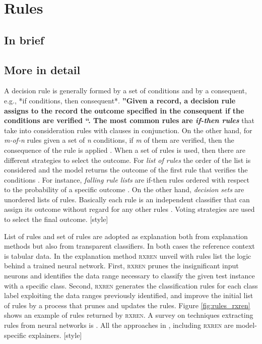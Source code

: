 \section{Rules}

\subsection{In brief}

\subsection{More in detail}

A decision rule is generally formed by a set of conditions and by a consequent, e.g.,
*if conditions, then consequent*. \textbf{''Given a record, a decision rule assigns to the record
the outcome specified in the consequent if the conditions are verified \cite{agrawalVLDB}``. The most
common rules are \emph{if-then rules}} that take into consideration rules with clauses in
conjunction. On the other hand, for \emph{m-of-n} rules given a set of \emph{n} conditions, if \emph{m}
of them are verified, then the consequence of the rule is applied \cite{murphyML}. When a set
of rules is used, then there are different strategies to select the outcome. For \emph{list of
rules} the order of the list is considered and the model returns the outcome of the
first rule that verifies the conditions \cite{yinICDM}. For instance, \emph{falling rule lists} are if-then rules ordered with respect to the probability of a specific outcome \cite{rudin2015}. On the other hand, \emph{decision sets} are unordered lists of rules. Basically each rule is an independent
classifier that can assign its outcome without regard for any other rules \cite{lakkaraju39}. Voting
strategies are used to select the final outcome. [style]


List of rules and set of rules are adopted as explanation both from explanation
methods but also from transparent classifiers. In both cases the reference context is
tabular data. In \cite{augasta8} the explanation method \textsc{rxren} unveil with rules list the logic
behind a trained neural network. First, \textsc{rxren} prunes the insignificant input neurons
and identifies the data range necessary to classify the given test instance with a
specific class. Second, \textsc{rxren} generates the classification rules for each class label
exploiting the data ranges previously identified, and improve the initial list of rules
by a process that prunes and updates the rules. Figure \ref{fig:rules_rxren} shows an example of rules
returned by \textsc{rxren}. A survey on techniques extracting rules from neural networks
is \cite{Andrews4}. All the approaches in \cite{Andrews4}, including \textsc{rxren} are model-specific explainers. [style]

